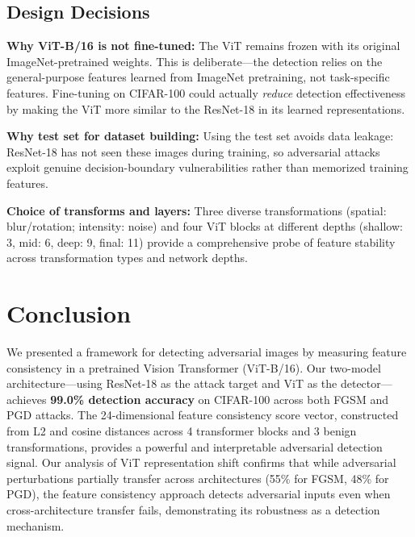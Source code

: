 \documentclass[12pt, a4paper]{article}
\begin{document}
\subsection{Design Decisions}

\textbf{Why ViT-B/16 is not fine-tuned:}
The ViT remains frozen with its original ImageNet-pretrained weights.
This is deliberate---the detection relies on the general-purpose features
learned from ImageNet pretraining, not task-specific features. Fine-tuning
on CIFAR-100 could actually \emph{reduce} detection effectiveness by
making the ViT more similar to the ResNet-18 in its learned
representations.

\textbf{Why test set for dataset building:}
Using the test set avoids data leakage: ResNet-18 has not seen these
images during training, so adversarial attacks exploit genuine
decision-boundary vulnerabilities rather than memorized training features.

\textbf{Choice of transforms and layers:}
Three diverse transformations (spatial: blur/rotation; intensity: noise)
and four ViT blocks at different depths (shallow: 3, mid: 6, deep: 9,
final: 11) provide a comprehensive probe of feature stability across
transformation types and network depths.

\section{Conclusion}

We presented a framework for detecting adversarial images by measuring
feature consistency in a pretrained Vision Transformer (ViT-B/16). Our
two-model architecture---using ResNet-18 as the attack target and ViT as
the detector---achieves \textbf{99.0\% detection accuracy} on CIFAR-100
across both FGSM and PGD attacks. The 24-dimensional feature consistency
score vector, constructed from L2 and cosine distances across 4
transformer blocks and 3 benign transformations, provides a powerful and
interpretable adversarial detection signal. Our analysis of ViT
representation shift confirms that while adversarial perturbations
partially transfer across architectures (55\% for FGSM, 48\% for PGD),
the feature consistency approach detects adversarial inputs even when
cross-architecture transfer fails, demonstrating its robustness as a
detection mechanism.
\end{document}

